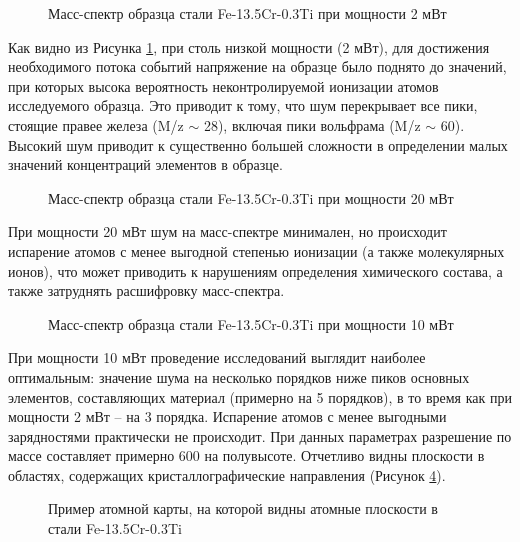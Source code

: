 \begin{figure}[htb]
	\caption{Масс-спектр образца стали Fe-13.5Cr-0.3Ti при мощности 2 мВт}
	\label{fig:Oleg_mass_spectr_2mv}
\end{figure}

Как видно из Рисунка \cref{fig:Oleg_mass_spectr_2mv}, при столь низкой мощности (2 мВт), для достижения необходимого потока событий напряжение на образце было поднято до значений, при которых высока вероятность неконтролируемой ионизации атомов исследуемого образца. Это приводит к тому, что шум перекрывает все пики, стоящие правее железа (M/z $\sim$ 28), включая пики вольфрама (M/z $\sim$ 60). Высокий шум приводит к существенно большей сложности в определении малых значений концентраций элементов в образце.

\begin{figure}[htb]
	\caption{Масс-спектр образца стали Fe-13.5Cr-0.3Ti при мощности 20 мВт}
	\label{fig:Oleg_mass_spectr_20mv}
\end{figure}

При мощности 20 мВт шум на масс-спектре минимален, но происходит испарение атомов с менее выгодной степенью ионизации (а также молекулярных ионов), что может приводить к нарушениям определения химического состава, а также затруднять расшифровку масс-спектра.

\begin{figure}[htb]
	\caption{Масс-спектр образца стали Fe-13.5Cr-0.3Ti при мощности 10 мВт}
	\label{fig:Oleg_mass_spectr_10mv}
\end{figure}

При мощности 10 мВт проведение исследований выглядит наиболее оптимальным: значение шума на несколько порядков ниже пиков основных элементов, составляющих материал (примерно на 5 порядков), в то время как при мощности 2 мВт – на 3 порядка. Испарение атомов с менее выгодными зарядностями практически не происходит. При данных параметрах разрешение по массе составляет примерно 600 на полувысоте. Отчетливо видны плоскости в областях, содержащих кристаллографические направления (Рисунок \cref{fig:Oleg_3D}).

\begin{figure}[htb]
	\caption{Пример атомной карты, на которой видны атомные плоскости в стали Fe-13.5Cr-0.3Ti}
	\label{fig:Oleg_3D}
\end{figure}

